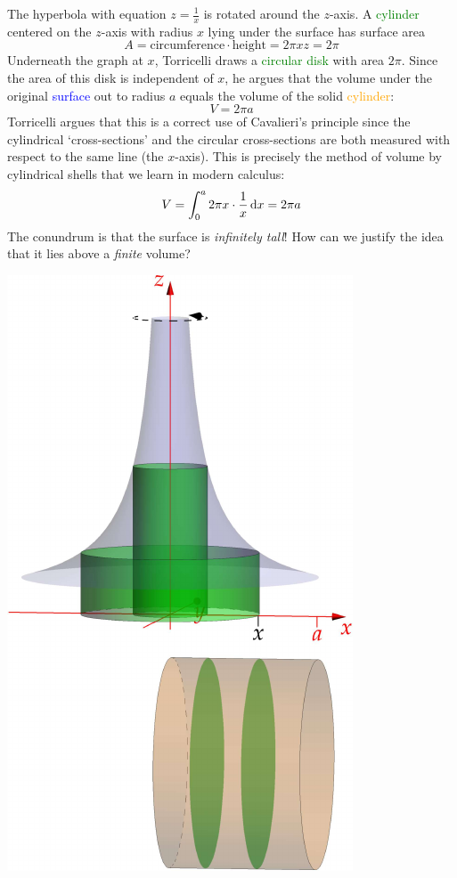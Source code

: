 \begin{minipage}[t]{0.58\linewidth}\vspace{-5pt}
The hyperbola with equation $z=\frac 1x$ is rotated around the $z$-axis. A \textcolor{Green}{cylinder} centered on the $z$-axis with radius $x$ lying under the surface has surface area
\[A=\text{circumference}\cdot\text{height}=2\pi xz=2\pi\]
Underneath the graph at $x$, Torricelli draws a \textcolor{Green}{circular disk} with area $2\pi$. Since the area of this disk is independent of $x$, he argues that the volume under the original \textcolor{blue}{surface} out to radius $a$ equals the volume of the solid \textcolor{orange}{cylinder}:
\[V=2\pi a\]
Torricelli argues that this is a correct use of Cavalieri's principle since the cylindrical `cross-sections' and the circular cross-sections are both measured with respect to the same line (the $x$-axis).\smallbreak
This is precisely the method of volume by cylindrical shells that we learn in modern calculus:
\[V=\int_0^a 2\pi x\cdot\frac 1x\,{\mathrm{d} x}=2\pi a\]
The conundrum is that the surface is \emph{infinitely tall}! How can we justify the idea that it lies above a \emph{finite} volume?
\end{minipage}\hfill\begin{minipage}[t]{0.41\linewidth}\vspace{-10pt}
\flushright
\href{http://www.math.uci.edu/~ndonalds/math184/analytic-torri2.html}{
\includegraphics{analytic-torri2}
}
\end{minipage}
\bigbreak

